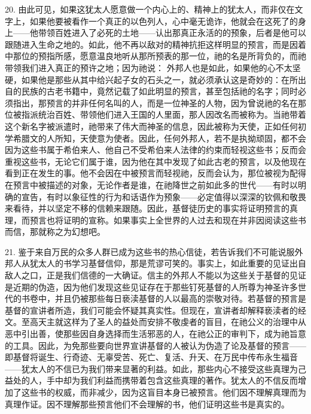 20. 由此可见，如果这犹太人愿意做一个内心上的、精神上的犹太人，而非仅在文字上，如果他要被看作一个真正的以色列人，心中毫无诡诈，他就会在这死了的身上——他带领百姓进入了必死的土地——认出那真正永活的的预象，后者是他可以跟随进入生命之地的。如此，他不再以敌对的精神抗拒这样明显的预言，而是因着中那位的预指所感，愿意温良地听从那所预表的那一位，祂的名是所背负的，而祂带领我们进入真正的预许之地；因为祂说： 外邦人也是如此，如果他的心不太坚硬，如果他是那些从其中给兴起子女的石头之一，就必须承认这是奇妙的：在所出自的民族的古老书籍中，竟然记载了如此明显的预言，甚至包括祂的名字；同时必须指出，那预言的并非任何名叫的人，而是一位神圣的人物，因为曾说祂的名在那位被指派统治百姓、带领他们进入王国的人里面，那人因改名而被称为。当祂带着这个新名字被派遣时，祂带来了伟大而神圣的信息，因此被称为天使，正如任何初学希腊文的人所知，天使意为使者。因此，任何外邦人，若不是执拗顽固，都不会因为这些书属于希伯来人、他自己不受希伯来人法律的约束而轻视这些书；反而会重视这些书，无论它们属于谁，因为他在其中发现了如此古老的预言，以及他现在看到正在发生的事。他不会因在中被预言而轻视祂，反而会认为，那位被视为配得在预言中被描述的对象，无论作者是谁，在祂降世之前如此多的世代——有时以明确的宣告，有时以象征性的行为和话语作为预象——必定值得以深深的钦佩和敬畏来看待，并以坚定不移的信赖来跟随。因此，基督徒历史的事实将证明预言的真理，而预言也将证明的宣称。如果事实上全世界的人过去和现在并非因阅读这些书而信，那就称之为幻想吧。\par

21. 鉴于来自万民的众多人群已成为这些书的热心信徒，若告诉我们不可能说服外邦人从犹太人的书学习基督信仰，那是荒谬可笑的。事实上，如此重要的见证出自敌人之口，正是我们信德的一大确证。信主的外邦人不能以为这些关于基督的见证是近期的伪造，因为他们发现这些见证存在于那些钉死基督的人所尊为神圣许多世代的书卷中，并且仍被那些每日亵渎基督的人以最高的崇敬对待。若基督的预言是基督的宣讲者所造，我们可能会怀疑其真实性。但现在，宣讲者却解释亵渎者的经文。至高天主就这样为了圣人的益处而安排不敬虔者的盲目，在祂公义的治理中从恶中引出善，使那些因自身选择而生活邪恶的人，在祂公正的审判下，成为祂旨意的工具。因此，为免那些要向世界宣讲基督的人被认为伪造了论及基督的预言——即基督将诞生、行奇迹、无辜受苦、死亡、复活、升天、在万民中传布永生福音——犹太人的不信已为我们带来显著的利益。如此，那些内心不接受这些真理为己益处的人，手中却为我们利益而携带着包含这些真理的著作。犹太人的不信反而增加了这些书的权威，而非减少，因为这盲目本身已被预言。他们因不理解真理而为真理作证。因不理解那些预言他们不会理解的书，他们证明这些书是真实的。\par

